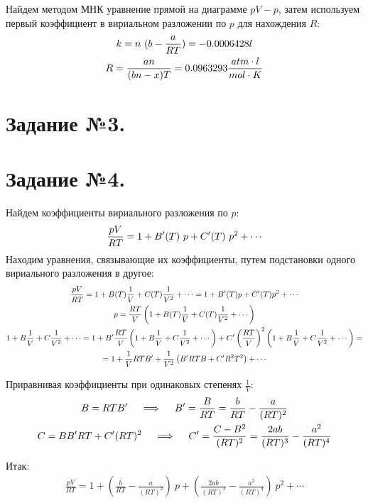 \documentclass[a4paper]{article}
\begin{document}
Найдем методом МНК уравнение прямой на диаграмме $pV - p$, затем используем первый коэффициент в вириальном разложении по $p$ для нахождения $R$:
\begin{gather}
k = n \ (b - \frac{a}{RT} ) = -0.0006428 l \notag \\
R = \frac{an}{(bn - x) T} = 0.0963293 \frac{atm \cdot l}{mol \cdot K}\notag
\end{gather}

\section{Задание №3.}

\section{Задание №4.}
Найдем коэффициенты вириального разложения по $p$:
\begin{gather}
\frac{p V}{R T} = 1 + B^\prime (T)\ p + C^\prime (T) \ p^2 + \cdots \notag 
\end{gather}
Находим уравнения, связывающие их коэффициенты, путем подстановки одного вириального разложения в другое:
\begin{gather}
\frac{p V}{R T} = 1 + B(T) \frac{1}{V} + C(T) \frac{1}{V^2} + \cdots = 1 + B^\prime (T) p + C^\prime (T) p^2 + \cdots \notag \\
p = \frac{RT}{V} \left( 1 + B(T) \frac{1}{V} + C(T) \frac{1}{V^2} + \cdots \right) \notag \\
1 + B \frac{1}{V} + C \frac{1}{V^2} + \cdots = 1 + B^\prime \frac{RT}{V} \left( 1 + B \frac{1}{V} + C \frac{1}{V^2} + \cdots \right)
+ C^\prime \left( \frac{RT}{V} \right)^2 \left( 1 + B \frac{1}{V} + C \frac{1}{V^2} + \cdots \right)= \notag \\
= 1 + \frac{1}{V} RT B^\prime + \frac{1}{V^2} \left( B^\prime RT B + C^\prime R^2 T^2 \right) + \cdots \notag
\end{gather}

Приравнивая коэффициенты при одинаковых степенях $\frac{1}{V}$:
\begin{gather}
B = RT B^\prime \quad \implies \quad B^\prime = \frac{B}{RT} = \frac{b}{RT} - \frac{a}{(RT)^2} \notag \\
C = B B^\prime RT + C^\prime (RT)^2 \quad \implies \quad C^\prime = \frac{C - B^2}{(RT)^2} = \frac{2ab}{(RT)^3} - \frac{a^2}{(RT)^4} \notag
\end{gather}

Итак:
\begin{gather}
\frac{pV}{RT} = 1 + \left( \frac{b}{RT} - \frac{a}{(RT)^2} \right) \ p + \left( \frac{2ab}{(RT)^3} - \frac{a^2}{(RT)^4} \right) \ p^2 + \cdots
\end{gather}
\end{document}

